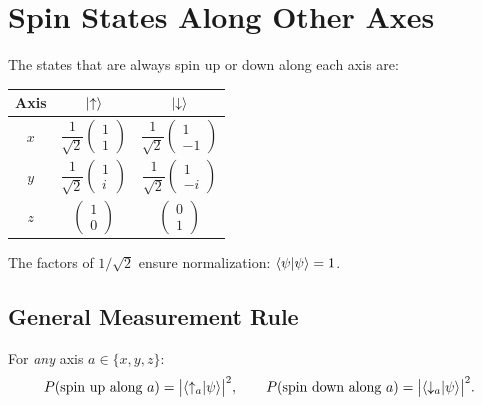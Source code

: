 \documentclass[11pt,a4paper]{article}
\theoremstyle{definition}
\theoremstyle{plain}
\theoremstyle{remark}
\begin{document}
\section{Spin States Along Other Axes}

The states that are always spin up or down along each axis are:

\begin{center}
\renewcommand{\arraystretch}{1.6}
\begin{tabular}{c|c|c}
    \textbf{Axis} & $\ket{\uparrow}$ & $\ket{\downarrow}$ \\ \hline
    $x$ & $\dfrac{1}{\sqrt{2}}\begin{pmatrix}1\\1\end{pmatrix}$ & $\dfrac{1}{\sqrt{2}}\begin{pmatrix}1\\-1\end{pmatrix}$ \\[8pt]
    $y$ & $\dfrac{1}{\sqrt{2}}\begin{pmatrix}1\\i\end{pmatrix}$ & $\dfrac{1}{\sqrt{2}}\begin{pmatrix}1\\-i\end{pmatrix}$ \\[8pt]
    $z$ & $\begin{pmatrix}1\\0\end{pmatrix}$ & $\begin{pmatrix}0\\1\end{pmatrix}$
\end{tabular}
\end{center}

The factors of $1/\sqrt{2}$ ensure normalization: $\braket{\psi}{\psi} = 1$.

\subsection{General Measurement Rule}

For \emph{any} axis $a \in \{x, y, z\}$:
\[
    P(\text{spin up along } a) = \bigl|\braket{\uparrow_a}{\psi}\bigr|^2, \qquad
    P(\text{spin down along } a) = \bigl|\braket{\downarrow_a}{\psi}\bigr|^2.
\]
\end{document}
